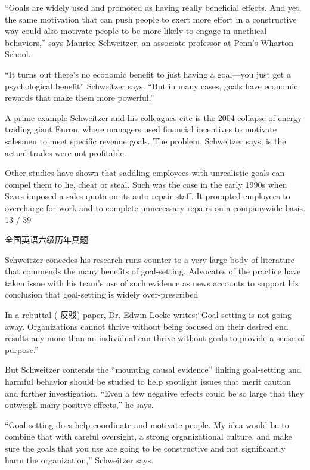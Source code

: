 \documentclass[UTF8,11pt]{ctexart}
\begin{document}
“Goals are widely used and promoted as having really beneficial effects. And yet, the same motivation that can push people to exert more effort in a constructive way could also motivate people to be more likely to engage in unethical behaviors,” says Maurice Schweitzer, an associate professor at Penn’s Wharton School.


“It turns out there’s no economic benefit to just having a goal---you just get a psychological benefit” Schweitzer says. “But in many cases, goals have economic rewards that make them more powerful.”


A prime example Schweitzer and his colleagues cite is the 2004 collapse of energy-trading giant Enron, where managers used financial incentives to motivate salesmen to meet specific revenue goals. The problem, Schweitzer says, is the actual trades were not profitable.


Other studies have shown that saddling employees with unrealistic goals can compel them to lie, cheat or steal. Such was the case in the early 1990s when Sears imposed a sales quota on its auto repair staff. It prompted employees to overcharge for work and to complete unnecessary repairs on a companywide basis. 13 / 39


全国英语六级历年真题


Schweitzer concedes his research runs counter to a very large body of literature that commends the many benefits of goal-setting. Advocates of the practice have taken issue with his team’s use of such evidence as news accounts to support his conclusion that goal-setting is widely over-prescribed


In a rebuttal ( 反驳) paper, Dr. Edwin Locke writes:“Goal-setting is not going away. Organizations cannot thrive without being focused on their desired end results any more than an individual can thrive without goals to provide a sense of purpose.”


But Schweitzer contends the “mounting causal evidence” linking goal-setting and harmful behavior should be studied to help spotlight issues that merit caution and further investigation. “Even a few negative effects could be so large that they outweigh many positive effects,” he says.


“Goal-setting does help coordinate and motivate people. My idea would be to combine that with careful oversight, a strong organizational culture, and make sure the goals that you use are going to be constructive and not significantly harm the organization,” Schweitzer says.
\end{document}
